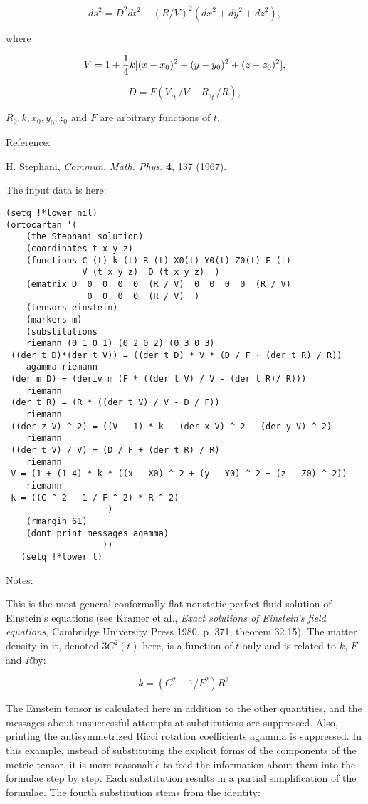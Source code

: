 $$ ds^2 = D^2 dt^2 - (R / V)^2 (dx^2 + dy^2 + dz^2), $$

\noindent where

$$ V = 1 + {1 \over 4} k [(x - x_0)^2  + (y - y_0 )^2  + (z - z_0)^2], $$

$$ D = F (V,_t / V - R,_t / R), $$

\noindent $R_0, k, x_0 , y_0 , z_0$ and $F$ are arbitrary functions of $t$.

\bigskip

\centerline{Reference:}

H. Stephani, {\it Commun. Math. Phys.} {\bf 4}, 137 (1967).

The input data is here:

\bigskip

\begin{verbatim}
(setq !*lower nil)
(ortocartan '(
    (the Stephani solution)
    (coordinates t x y z)
    (functions C (t) k (t) R (t) X0(t) Y0(t) Z0(t) F (t)
               V (t x y z)  D (t x y z)  )
    (ematrix D  0  0  0  0  (R / V)  0  0  0  0  (R / V)
                0  0  0  0  (R / V)  )
    (tensors einstein)
    (markers m)
    (substitutions
    riemann (0 1 0 1) (0 2 0 2) (0 3 0 3)
 ((der t D)*(der t V)) = ((der t D) * V * (D / F + (der t R) / R))
    agamma riemann
 (der m D) = (deriv m (F * ((der t V) / V - (der t R)/ R)))
    riemann
 (der t R) = (R * ((der t V) / V - D / F))
    riemann
 ((der z V) ^ 2) = ((V - 1) * k - (der x V) ^ 2 - (der y V) ^ 2)
    riemann
 ((der t V) / V) = (D / F + (der t R) / R)
    riemann
 V = (1 + (1 4) * k * ((x - X0) ^ 2 + (y - Y0) ^ 2 + (z - Z0) ^ 2))
    riemann
 k = ((C ^ 2 - 1 / F ^ 2) * R ^ 2)
                    )
    (rmargin 61)
    (dont print messages agamma)
                   ))
   (setq !*lower t)
\end{verbatim}

\bigskip

\centerline{Notes:}

This is the most  general  conformally  flat  nonstatic
     perfect fluid solution of Einstein's equations  (see  Kramer
     et al., {\it Exact  solutions  of  Einstein's  field  equations},
     Cambridge University Press 1980, p. 371, theorem 32.15). The
matter density in it, denoted $3C^2(t)$ here, is a function  of
     $t$ only and is related to $k$, $F$ and $R $by:

$$ k = (C^2 - 1/ F^2) R^2. $$

\noindent The Einstein tensor is calculated here in  addition  to  the
     other  quantities,  and  the  messages  about   unsuccessful
     attempts at substitutions are suppressed. Also, printing the
antisymmetrized Ricci rotation coefficients agamma  is  suppressed. In this
example, instead of  substituting  the  explicit forms of the components of the
metric tensor,  it  is
     more reasonable to feed the information about them into  the
     formulae step  by  step.  Each  substitution  results  in  a
partial simplification of the formulae. The  fourth  substitution stems from
the identity:

